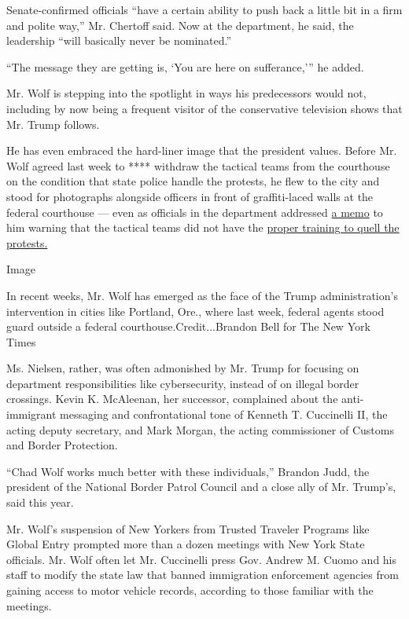 Senate-confirmed officials ``have a certain ability to push back a
little bit in a firm and polite way,'' Mr. Chertoff said. Now at the
department, he said, the leadership ``will basically never be
nominated.''

``The message they are getting is, `You are here on sufferance,''' he
added.

Mr. Wolf is stepping into the spotlight in ways his predecessors would
not, including by now being a frequent visitor of the conservative
television shows that Mr. Trump follows.

He has even embraced the hard-liner image that the president values.
Before Mr. Wolf agreed last week to **** withdraw the tactical teams
from the courthouse on the condition that state police handle the
protests, he flew to the city and stood for photographs alongside
officers in front of graffiti-laced walls at the federal courthouse ---
even as officials in the department addressed
\href{https://int.graylady3jvrrxbe.onion/data/documenttools/dh-stacticalagent-memo1/d490e392eab7d7d6/full.pdf}{a
memo} to him warning that the tactical teams did not have the
\href{https://www.nytimes3xbfgragh.onion/2020/07/18/us/portland-protests.html}{proper
training to quell the protests.}

Image

In recent weeks, Mr. Wolf has emerged as the face of the Trump
administration's intervention in cities like Portland, Ore., where last
week, federal agents stood guard outside a federal
courthouse.Credit...Brandon Bell for The New York Times

Ms. Nielsen, rather, was often admonished by Mr. Trump for focusing on
department responsibilities like cybersecurity, instead of on illegal
border crossings. Kevin K. McAleenan, her successor, complained about
the anti-immigrant messaging and confrontational tone of Kenneth T.
Cuccinelli II, the acting deputy secretary, and Mark Morgan, the acting
commissioner of Customs and Border Protection.

``Chad Wolf works much better with these individuals,'' Brandon Judd,
the president of the National Border Patrol Council and a close ally of
Mr. Trump's, said this year.

Mr. Wolf's suspension of New Yorkers from Trusted Traveler Programs like
Global Entry prompted more than a dozen meetings with New York State
officials. Mr. Wolf often let Mr. Cuccinelli press Gov. Andrew M. Cuomo
and his staff to modify the state law that banned immigration
enforcement agencies from gaining access to motor vehicle records,
according to those familiar with the meetings.

